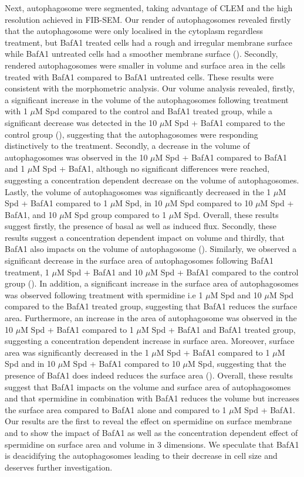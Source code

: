 Next, autophagosome were segmented, taking advantage of CLEM and the high resolution achieved in FIB-SEM. Our render of autophagosomes revealed firstly that the autophagosome were only localised in the cytoplasm regardless treatment, but BafA1 treated cells had a rough and irregular membrane surface while BafA1 untreated cells had a smoother membrane surface (). Secondly, rendered autophagosomes were smaller in volume and surface area in the cells treated with BafA1 compared to BafA1 untreated cells. These results were consistent with the morphometric analysis. Our volume analysis revealed, firstly, a significant increase in the volume of the autophagosomes following treatment with 1 $\mu$M Spd compared to the control and BafA1 treated group, while a significant decrease was detected in the 10 $\mu$M Spd + BafA1 compared to the control group (), suggesting that the autophagosomes were responding distinctively to the treatment.  Secondly, a decrease in the volume of autophagosomes was observed in the 10 $\mu$M Spd + BafA1 compared to BafA1 and 1 $\mu$M Spd + BafA1, although no significant differences were reached, suggesting a concentration  dependent decrease on the volume of autophagosomes. Lastly, the volume of autophagosomes was significantly decreased in the 1 $\mu$M Spd + BafA1 compared to 1 $\mu$M Spd, in 10 $\mu$M Spd  compared to 10 $\mu$M Spd + BafA1, and 10 $\mu$M Spd group compared to 1 $\mu$M Spd. Overall, these results suggest firstly, the presence of basal as well as induced flux. Secondly, these results suggest a concentration dependent impact on volume and thirdly, that BafA1 also impacts on the volume of autophagosome (). Similarly, we observed a significant decrease in the surface area of autophagosomes following  BafA1 treatment, 1 $\mu$M Spd + BafA1  and 10 $\mu$M Spd + BafA1 compared to the control group (). In addition, a significant increase in the surface area of autophagosomes was observed following treatment with spermidine i.e 1 $\mu$M Spd  and 10 $\mu$M Spd compared to the BafA1 treated group, suggesting that BafA1 reduces the surface area. Furthermore, an increase in the area of autophagosome was observed in the 10 $\mu$M Spd + BafA1 compared to 1 $\mu$M Spd + BafA1 and BafA1 treated group, suggesting a concentration dependent increase in surface area. Moreover, surface area was significantly decreased in the 1 $\mu$M Spd + BafA1 compared to 1 $\mu$M Spd and in 10 $\mu$M Spd + BafA1 compared to 10 $\mu$M Spd, suggesting that the presence of BafA1 does indeed reduces the surface area (). Overall, these results suggest that BafA1 impacts on the volume and surface area of autophagosomes and that spermidine in combination with BafA1 reduces the volume but increases the surface area compared to BafA1 alone and compared to 1 $\mu$M Spd + BafA1. Our results are the first to reveal the effect on spermidine on surface membrane and to show the impact of BafA1 as well as the concentration dependent effect of spermidine on surface area and volume in 3 dimensions. We speculate that BafA1 is deacidifying the autophagosomes leading to their decrease in cell size and deserves further investigation.
